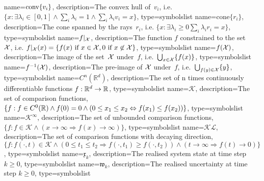 {
	name={\ensuremath{\conv\{v_i\}}},
	description={The convex hull of~$v_i$, i.e. $\{x:\exists\lambda_i\in[0,1]\wedge \sum_i\lambda_i=1\wedge \sum_i\lambda_i v_i=x\}$},
	type=symbolslist
}
%
{
	name={\ensuremath{\text{cone}\{r_i\}}},
	description={The cone spanned by the rays~$r_i$, i.e. $\{x:\exists\lambda_i\geq0 \sum_i\lambda_i r_i=x\}$},
	type=symbolslist
}
%
{
	name={\ensuremath{f\vert_\X}},
	description={The function $f$ constrained to the set~$\mathcal X$, i.e. $f\vert_\mathcal X(x)=\{f(x) \text{ if } x\in\mathcal X, 0\text{ if }x\not\in\mathcal X\}$},
	type=symbolslist
}
%
{
	name={\ensuremath{f(\X)}},
	description={The image of the set~$\mathcal X$ under~$f$, i.e.~$\bigcup_{x\in\mathcal X}\{f(x)\}$},
	type=symbolslist
}
%
{
	name={\ensuremath{f^{-1}(\X)}},
	description={The pre-image of $\mathcal X$ under~$f$, i.e.~$\bigcup_{f(y)\in\mathcal X}\{y\}$},
	type=symbolslist
}
%
{
	name={\ensuremath{C^n(\mathbb R^d)}},
	description={The set of n times continuously differentiable functions $f:\mathbb R^d\rightarrow\mathbb R$},
	type=symbolslist
}
%
{
	name={\ensuremath{\mathscr K}},
	description={The set of comparison functions, $\{f:f\in C^0(\mathbb R)\wedge f(0)=0\wedge (0\leq x_1\leq x_2\Leftrightarrow f(x_1)\leq f(x_2))\}$},
	type=symbolslist
}
%
{
	name={\ensuremath{\mathscr K^\infty}},
	description={The set of unbounded comparison functions, $\{f:f\in\mathscr K\wedge (x\rightarrow\infty\Rightarrow f(x)\rightarrow\infty)\}$},
	type=symbolslist
}
%
{
	name={\ensuremath{\mathscr K\!\mathscr L}},
	description={The set of comparison functions with decaying direction, $\{f:f(\cdot,t)\in\mathscr K\wedge (0\leq t_1\leq t_2\Rightarrow f(\cdot,t_1)\geq f(\cdot,t_2))\wedge (t\rightarrow\infty\Rightarrow f(t)\rightarrow0)\}$},
	type=symbolslist
}
%
{
	name={\ensuremath{\mathfrak{x}_k}},
	description={The realised system state at time step $k\geq0$},
	type=symbolslist
}
%
{
	name={\ensuremath{\mathfrak{w}_k}},
	description={The realised uncertainty at time step $k\geq0$},
	type=symbolslist
}